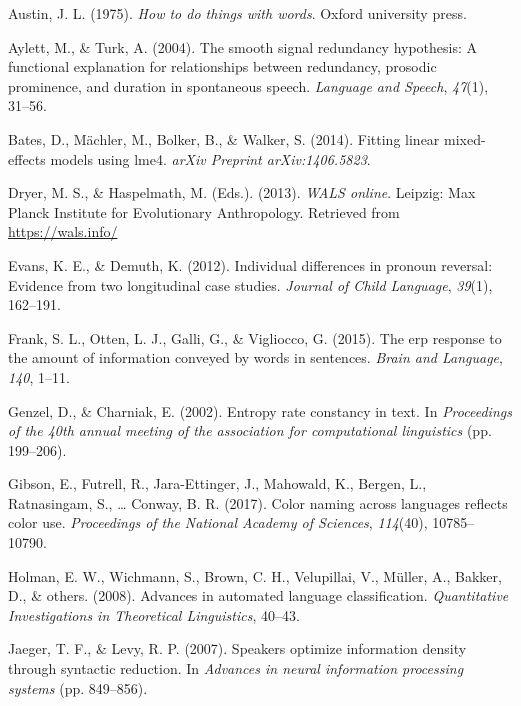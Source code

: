 \documentclass[man,floatsintext]{apa6}
\begin{document}
\leavevmode\hypertarget{ref-austin1975}{}%
Austin, J. L. (1975). \emph{How to do things with words}. Oxford university press.

\leavevmode\hypertarget{ref-aylett2004}{}%
Aylett, M., \& Turk, A. (2004). The smooth signal redundancy hypothesis: A functional explanation for relationships between redundancy, prosodic prominence, and duration in spontaneous speech. \emph{Language and Speech}, \emph{47}(1), 31--56.

\leavevmode\hypertarget{ref-bates2014}{}%
Bates, D., Mächler, M., Bolker, B., \& Walker, S. (2014). Fitting linear mixed-effects models using lme4. \emph{arXiv Preprint arXiv:1406.5823}.

\leavevmode\hypertarget{ref-wals}{}%
Dryer, M. S., \& Haspelmath, M. (Eds.). (2013). \emph{WALS online}. Leipzig: Max Planck Institute for Evolutionary Anthropology. Retrieved from \url{https://wals.info/}

\leavevmode\hypertarget{ref-evans2012}{}%
Evans, K. E., \& Demuth, K. (2012). Individual differences in pronoun reversal: Evidence from two longitudinal case studies. \emph{Journal of Child Language}, \emph{39}(1), 162--191.

\leavevmode\hypertarget{ref-frank2015}{}%
Frank, S. L., Otten, L. J., Galli, G., \& Vigliocco, G. (2015). The erp response to the amount of information conveyed by words in sentences. \emph{Brain and Language}, \emph{140}, 1--11.

\leavevmode\hypertarget{ref-genzel2002}{}%
Genzel, D., \& Charniak, E. (2002). Entropy rate constancy in text. In \emph{Proceedings of the 40th annual meeting of the association for computational linguistics} (pp. 199--206).

\leavevmode\hypertarget{ref-gibson2017}{}%
Gibson, E., Futrell, R., Jara-Ettinger, J., Mahowald, K., Bergen, L., Ratnasingam, S., \ldots{} Conway, B. R. (2017). Color naming across languages reflects color use. \emph{Proceedings of the National Academy of Sciences}, \emph{114}(40), 10785--10790.

\leavevmode\hypertarget{ref-holman2008}{}%
Holman, E. W., Wichmann, S., Brown, C. H., Velupillai, V., Müller, A., Bakker, D., \& others. (2008). Advances in automated language classification. \emph{Quantitative Investigations in Theoretical Linguistics}, 40--43.

\leavevmode\hypertarget{ref-jaeger2007}{}%
Jaeger, T. F., \& Levy, R. P. (2007). Speakers optimize information density through syntactic reduction. In \emph{Advances in neural information processing systems} (pp. 849--856).
\end{document}
